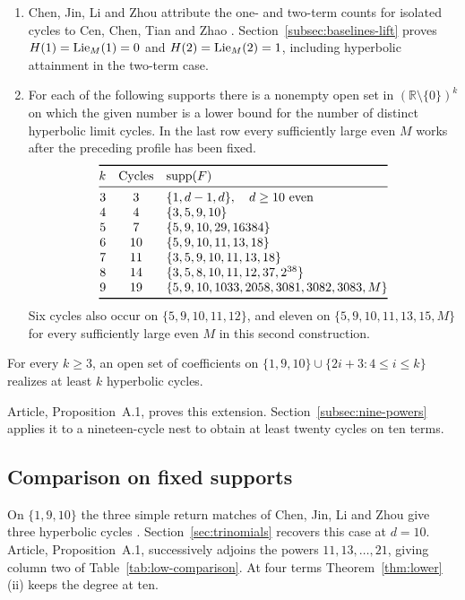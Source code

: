 \begin{theorem}\label{thm:lower}
\leavevmode
\begin{enumerate}
  \item[\textup{(i)}] Chen, Jin, Li and Zhou attribute the one- and
  two-term counts for isolated cycles to Cen, Chen, Tian and Zhao
  \cite[p.~2]{CJLZ}. Section~\ref{subsec:baselines-lift}
  proves $H(1)=\operatorname{Lie}_{M}(1)=0$ and $H(2)=\operatorname{Lie}_{M}(2)=1$, including
  hyperbolic attainment in the two-term case.
  \item[\textup{(ii)}] For each of the following supports there is a
  nonempty open set in $(\mathbb R\setminus\{0\})^k$ on which the given
  number is a lower bound for the number of distinct hyperbolic limit cycles.
  In the last row every sufficiently large even $M$ works after the
  preceding profile has been fixed.
\[
\begin{array}{@{}rcl@{}}
\toprule
 k & \text{Cycles} & \supp(F)\\
\midrule
 3 & 3  & \{1,d-1,d\},\quad d\ge10\ \text{even}\\
 4 & 4  & \{3,5,9,10\}\\
 5 & 7  & \{5,9,10,29,16384\}\\
 6 & 10 & \{5,9,10,11,13,18\}\\
 7 & 11 & \{3,5,9,10,11,13,18\}\\
 8 & 14 & \{3,5,8,10,11,12,37,2^{38}\}\\
 9 & 19 & \{5,9,10,1033,2058,3081,3082,3083,M\}\\
\bottomrule
\end{array}
\]
  Six cycles also occur on
  $\{5,9,10,11,12\}$, and eleven on $\{5,9,10,11,13,15,M\}$ for every
  sufficiently large even $M$ in this second construction.
\end{enumerate}
\end{theorem}

\hypertarget{trinomial.extension}{}
\begin{corollary}\label{cor:odd-lift}
For every $k\ge3$, an open set of coefficients on
$\{1,9,10\}\cup\{2i+3:4\le i\le k\}$ realizes at least $k$
hyperbolic cycles.
\end{corollary}

Article, Proposition~A.1, proves this extension. Section~\ref{subsec:nine-powers}
applies it to a nineteen-cycle nest to obtain at least twenty cycles
on ten terms.

\subsection{Comparison on fixed supports}\label{subsec:full-support}
On $\{1,9,10\}$ the three simple return matches of Chen, Jin, Li and
Zhou give three hyperbolic cycles \cite[(3.1) and proof of
Theorem~1.2]{CJLZ}. Section~\ref{sec:trinomials} recovers this case
at $d=10$. Article, Proposition~A.1, successively adjoins the powers
$11,13,\ldots,21$, giving column two of Table~\ref{tab:low-comparison}.
At four terms Theorem~\ref{thm:lower}(ii) keeps the degree at ten.

